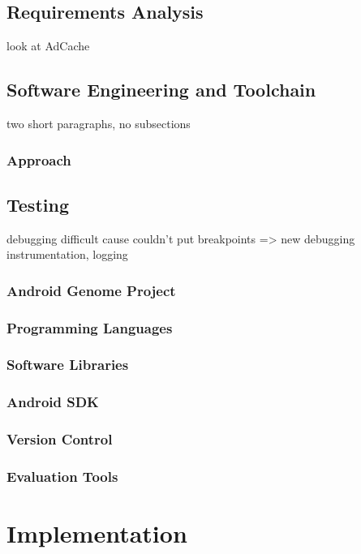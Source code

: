 \documentclass[12pt,twoside,notitlepage]{report}
\begin{document}
\section{Requirements Analysis}
look at AdCache

\section{Software Engineering and Toolchain}

two short paragraphs, no subsections

\subsection{Approach}

\section{Testing}

debugging difficult cause couldn't put breakpoints => new debugging instrumentation, logging

\subsection{Android Genome Project}

\subsection{Programming Languages}

\subsection{Software Libraries}

\subsection{Android SDK}

\subsection{Version Control}

\subsection{Evaluation Tools}

\cleardoublepage
\chapter{Implementation}
\end{document}
